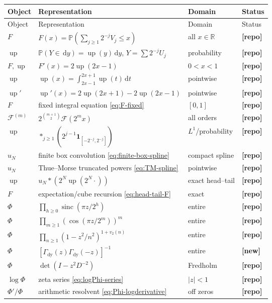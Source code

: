 \documentclass[11pt,oneside]{article}
\theoremstyle{definition}
\theoremstyle{remark}
\newcommand{\R}{\mathbb R}
\newcommand{\Prob}{\mathbb P}
\newcommand{\Up}{\operatorname{up}}
\newcommand{\sinc}{\operatorname{sinc}}
\newcommand{\dd}{\,\mathrm d}
\newcommand{\vtwo}{v_2}
\newcommand{\GammaDy}{\Gamma_{\!\mathrm{dy}}}
\newcommand{\Fcal}{\mathcal F}
\newcommand{\RepoShort}{\textcolor{deepblue}{\textbf{[repo]}}}
\newcommand{\NewShort}{\textcolor{amber}{\textbf{[new]}}}
\begin{document}
\begingroup
\small
\setlength{\tabcolsep}{4pt}
\renewcommand{\arraystretch}{1.18}
\begin{longtable}{@{}p{}p{}p{}p{}@{}}
\toprule
Object & Representation & Domain & Status \\
\midrule
\endfirsthead
\toprule
Object & Representation & Domain & Status \\
\midrule
\endhead
$F$ & $F(x)=\Prob(\sum_{j\ge1}2^{-j}V_j\le x)$ & all $x\in\R$ & \RepoShort \\
$\Up$ & $\Prob(Y\in\dd y)=\Up(y)\dd y$, $Y=\sum2^{-j}U_j$ & probability & \RepoShort \\
$F,\Up$ & $F'(x)=2\Up(2x-1)$ & $0<x<1$ & \RepoShort \\
$\Up$ & $\Up(x)=\int_{2x-1}^{2x+1}\Up(t)\dd t$ & pointwise & \RepoShort \\
$\Up'$ & $\Up'(x)=2\Up(2x+1)-2\Up(2x-1)$ & pointwise & \RepoShort \\
$F$ & fixed integral equation \eqref{eq:F-fixed} & $[0,1]$ & \RepoShort \\
$\Fcal^{(m)}$ & $2^{\binom{m+1}{2}}\Fcal(2^mx)$ & all orders & \RepoShort \\
$\Up$ & $\ast_{j\ge1}(2^{j-1}\mathbf1_{[-2^{-j},2^{-j}]})$ & $L^1$/probability & \RepoShort \\
$u_N$ & finite box convolution \eqref{eq:finite-box-spline} & compact spline & \RepoShort \\
$u_N$ & Thue--Morse truncated powers \eqref{eq:TM-spline} & pointwise & \RepoShort \\
$\Up$ & $u_N\ast(2^N\Up(2^N\cdot))$ & exact head--tail & \RepoShort \\
$F$ & expectation/cube recursion \eqref{eq:head-tail-F} & exact & \RepoShort \\
$\Phi$ & $\prod_{h\ge0}\sinc(\pi z/2^h)$ & entire & \RepoShort \\
$\Phi$ & $\prod_{m\ge1}(\cos(\pi z/2^m))^m$ & entire & \RepoShort \\
$\Phi$ & $\prod_{n\ge1}(1-z^2/n^2)^{1+\vtwo(n)}$ & entire & \RepoShort \\
$\Phi$ & $[\GammaDy(z)\GammaDy(-z)]^{-1}$ & entire & \NewShort \\
$\Phi$ & $\det(I-z^2D^{-2})$ & Fredholm & \RepoShort \\
$\log\Phi$ & zeta series \eqref{eq:logPhi-series} & $|z|<1$ & \RepoShort \\
$\Phi'/\Phi$ & arithmetic resolvent \eqref{eq:Phi-logderivative} & off zeros & \RepoShort \\

\end{longtable}
\end{document}
